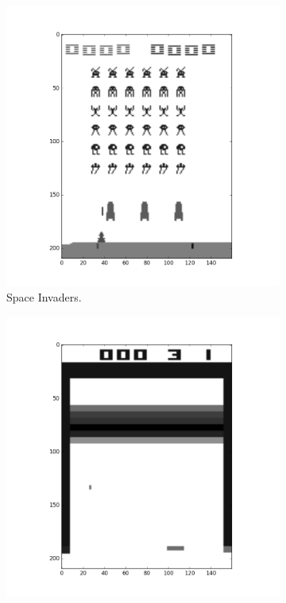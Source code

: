 \documentclass[11pt]{article}
\begin{document}
\begin{figure}[H]
    \begin{subfigure}{.3\textwidth}
        \centering
        \includegraphics[scale=0.25]{include/space_invaders_1_gray.png}
        \caption{Space Invaders.}
        \label{fig:scan}
    \end{subfigure}
    \begin{subfigure}{.3\textwidth}
        \centering
        \includegraphics[scale=0.25]{include/breakout_1_gray.png}

\end{subfigure}
\end{figure}
\end{document}
